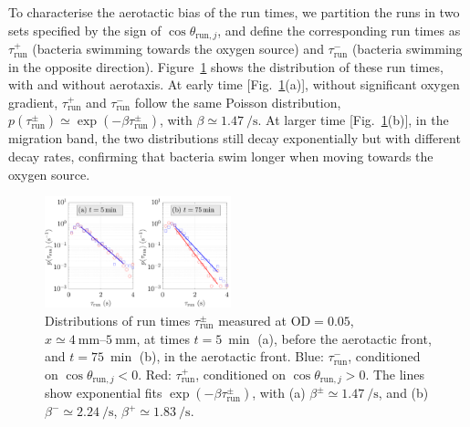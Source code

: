 \documentclass[aps,a4paper,twocolumn,10pt,pre,showpacs]{revtex4-2}
\begin{document}
To characterise the aerotactic bias of the run times, we partition the runs in two sets specified by the sign of $\cos \theta_{\mathrm{run,}j}$, and define the corresponding run times as $\tau_{\mathrm{run}}^+$ (bacteria swimming towards the oxygen source) and $\tau_{\mathrm{run}}^-$ (bacteria swimming in the opposite direction). Figure~\ref{fig:taurun_distri} shows the distribution of these run times, with and without aerotaxis. At early time [Fig.~\ref{fig:taurun_distri}(a)], without significant oxygen gradient, $\tau_{\mathrm{run}}^+$ and $\tau_{\mathrm{run}}^-$ follow the same Poisson distribution, $p(\tau_\mathrm{run}^{\pm}) \simeq \exp(-\beta \tau_{\mathrm{run}}^{\pm})$, with $\beta \simeq\SI{1.47}{\per\s}$. At larger time [Fig.~\ref{fig:taurun_distri}(b)], in the migration band, the two distributions still decay exponentially but with different decay rates, confirming that bacteria swim longer when moving towards the oxygen source.

\begin{figure}[b]
\includegraphics[trim = 0mm 0mm 0mm 0mm, clip, width=0.48\textwidth, angle=0]{Fig07.pdf} 
\caption{Distributions of run times $\tau_{\mathrm{run}}^\pm$ measured at $\mathrm{OD}=0.05$, $x\simeq \SIrange{4}{5}{\mm}$, at times $t=\SI{5}{\min}$ (a), before the aerotactic front, and $t=\SI{75}{\min}$ (b), in the aerotactic front. Blue: $\tau_{\mathrm{run}}^-$, conditioned on $\cos \theta_{\mathrm{run,}j}<0$. Red: $\tau_{\mathrm{run}}^+$, conditioned on $\cos \theta_{\mathrm{run,}j}>0$. The lines show exponential fits $\exp(-\beta \tau_{\mathrm{run}}^{\pm})$, with (a) $\beta^\pm \simeq \SI{1.47}{\per\s}$, and (b) $\beta^- \simeq \SI{2.24}{\per\s}$, $\beta^+ \simeq \SI{1.83}{\per\s}$.}
\label{fig:taurun_distri}
\end{figure}
\end{document}
